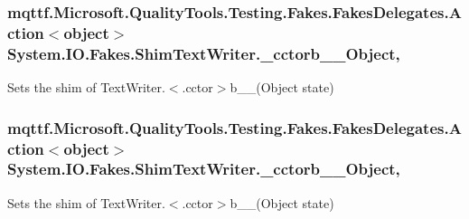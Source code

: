 \hypertarget{class_system_1_1_i_o_1_1_fakes_1_1_shim_text_writer_aa26ab7dca39a3773611948cc10b16608}{
\subsubsection[{\-\_\-cctorb\-\_\-\-\_\-4\-Object}]{\setlength{\rightskip}{0pt plus 5cm}mqttf.\-Microsoft.\-Quality\-Tools.\-Testing.\-Fakes.\-Fakes\-Delegates.\-Action$<$object$>$ System.\-I\-O.\-Fakes.\-Shim\-Text\-Writer.\-\_\-cctorb\-\_\-\-\_\-Object\hspace{0.3cm}{\ttfamily [static]}, {\ttfamily [set]}}}\label{class_system_1_1_i_o_1_1_fakes_1_1_shim_text_writer_aa26ab7dca39a3773611948cc10b16608}


Sets the shim of Text\-Writer.$<$.cctor$>$b\-\_\-\-\_(\-Object state)

\hypertarget{class_system_1_1_i_o_1_1_fakes_1_1_shim_text_writer_a6c373bd032cace75a93ef9a9a9ac7766}{
\subsubsection[{\-\_\-cctorb\-\_\-\-\_\-5\-Object}]{\setlength{\rightskip}{0pt plus 5cm}mqttf.\-Microsoft.\-Quality\-Tools.\-Testing.\-Fakes.\-Fakes\-Delegates.\-Action$<$object$>$ System.\-I\-O.\-Fakes.\-Shim\-Text\-Writer.\-\_\-cctorb\-\_\-\-\_\-Object\hspace{0.3cm}{\ttfamily [static]}, {\ttfamily [set]}}}\label{class_system_1_1_i_o_1_1_fakes_1_1_shim_text_writer_a6c373bd032cace75a93ef9a9a9ac7766}


Sets the shim of Text\-Writer.$<$.cctor$>$b\-\_\-\-\_(\-Object state)

